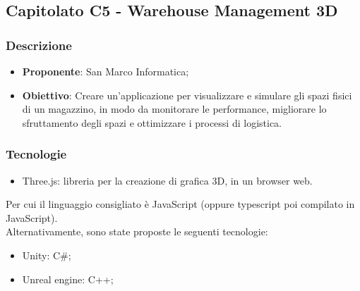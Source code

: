 \subsection{Capitolato C5 - Warehouse Management 3D}


\subsubsection{Descrizione}
\begin{itemize}
    \item \textbf{Proponente}: San Marco Informatica;
    \item \textbf{Obiettivo}: 
	    Creare un'applicazione per visualizzare e simulare gli spazi fisici di
		un magazzino, in modo da monitorare le performance, migliorare lo
		sfruttamento degli spazi e ottimizzare i processi di logistica.

\end{itemize}


\subsubsection{Tecnologie}
\begin{itemize}
    \item Three.js: libreria per la creazione di grafica 3D, in un
	browser web.
\end{itemize}

Per cui il linguaggio consigliato è JavaScript (oppure typescript poi compilato 
in JavaScript). \\
Alternativamente, sono state proposte le seguenti tecnologie:

\begin{itemize}
	\item Unity: C\#;
	\item Unreal engine: C++;
\end{itemize}


